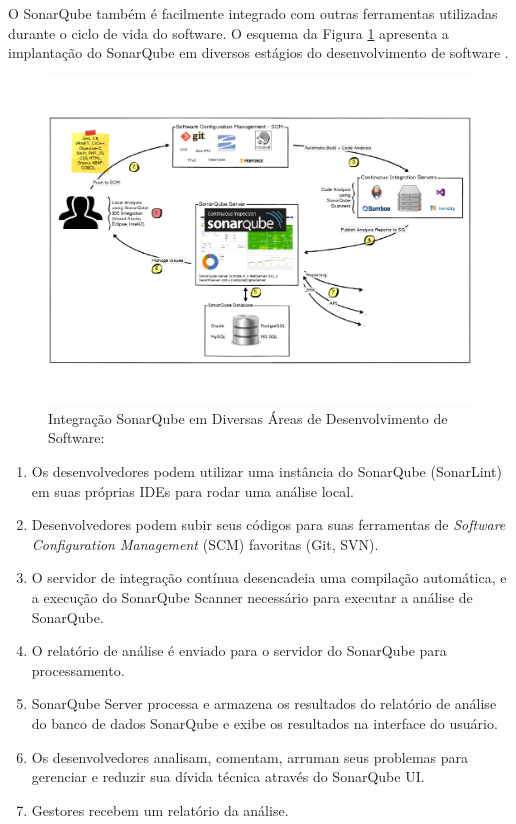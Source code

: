 O SonarQube também é facilmente integrado com outras ferramentas utilizadas durante o ciclo de vida do software. O esquema da Figura \ref{img:sonar_int} apresenta a implantação do SonarQube em diversos estágios do desenvolvimento de software \cite{sonar}.
\graphicspath{{figuras/}}
\begin{figure}[h]
\centering
\includegraphics[scale=0.5]{sonar_int}
\caption{Integração SonarQube em Diversas Áreas de Desenvolvimento de Software: \cite{sonar}}
\label{img:sonar_int}
\end{figure}
\begin{enumerate}
\item Os desenvolvedores podem utilizar uma instância do SonarQube (SonarLint) em suas próprias IDEs para rodar uma análise local.
\item Desenvolvedores podem subir seus códigos para suas ferramentas de \textit{Software Configuration Management} (SCM) favoritas (Git, SVN).
\item O servidor de integração contínua desencadeia uma compilação automática, e a execução do SonarQube Scanner necessário para executar a análise de SonarQube.
\item O relatório de análise é enviado para o servidor do SonarQube para processamento.
\item SonarQube Server processa e armazena os resultados do relatório de análise do banco de dados SonarQube e exibe os resultados na interface do usuário.
\item Os desenvolvedores analisam, comentam, arruman seus problemas para gerenciar e reduzir sua dívida técnica através do SonarQube UI.
\item Gestores recebem um relatório da análise.
\end{enumerate}

